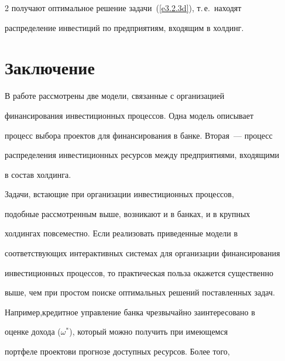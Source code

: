 \begin{multicols}{2}
получают оптимальное решение задачи~(\ref{e3.2.3d}), т.\,е.\ находят 


распределение инвестиций по предприятиям, входящим в холдинг.





\vspace*{-9pt}





\section{Заключение}





\vspace*{-6pt}


     


     В работе рассмотрены две модели, связанные с организацией 


финансирования инвестиционных процессов. Одна модель описывает 


процесс выбора проектов для финансирования в банке. Вторая~--- процесс 


распределения инвестиционных ресурсов между предприятиями, входящими 


в состав холдинга. 


     


     Задачи, встающие при организации инвестиционных процессов, 


подобные рассмотренным выше, возникают и в банках, и в крупных 


холдингах повсеместно. Если реализовать приведенные модели в 


соответствующих интерактивных системах для организации финансирования 


инвестиционных процессов, то практическая польза окажется существенно 


выше, чем при простом поиске оптимальных решений поставленных задач. 


Например,\linebreak кредитное управление банка чрезвычайно заин\-тересовано в 


оценке дохода ($\omega^*$), который можно получить при имеющемся 


портфеле проектов\linebreak и прогнозе доступных ресурсов. Более того, 



\end{multicols}
